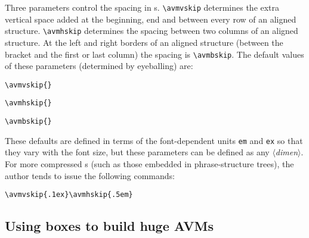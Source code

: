 Three parameters control the spacing in {\AVM}s.  \verb+\avmvskip+ determines
the extra vertical space added at the beginning, end and between every row
of an aligned structure.  \verb+\avmhskip+ determines the spacing between
two columns of an aligned structure.  At the left and right borders of an
aligned structure (between the bracket and the first or last column) the
spacing is \verb+\avmbskip+.  
The default values of these parameters (determined by eyeballing) are:
%
\begin{examples}
\item \verb+\avmvskip{+{\tt \avmjvskip}\verb+}+
\item \verb+\avmhskip{+{\tt \avmjhskip}\verb+}+
\item \verb+\avmbskip{+{\tt \avmjbskip}\verb+}+
\end{examples}
%
These defaults are defined in terms of the font-dependent units \verb+em+
and \verb+ex+ so that they vary with the font size, but these parameters
can be defined as any  
$\langle${\em dimen}$\rangle$.  For more compressed {\AVM}s (such as those
embedded in phrase-structure trees), the author tends to issue the
following commands:
%
\begin{example}
\verb+\avmvskip{.1ex}\avmhskip{.5em}+
\end{example}


\subsection{Using boxes to build huge AVMs}

